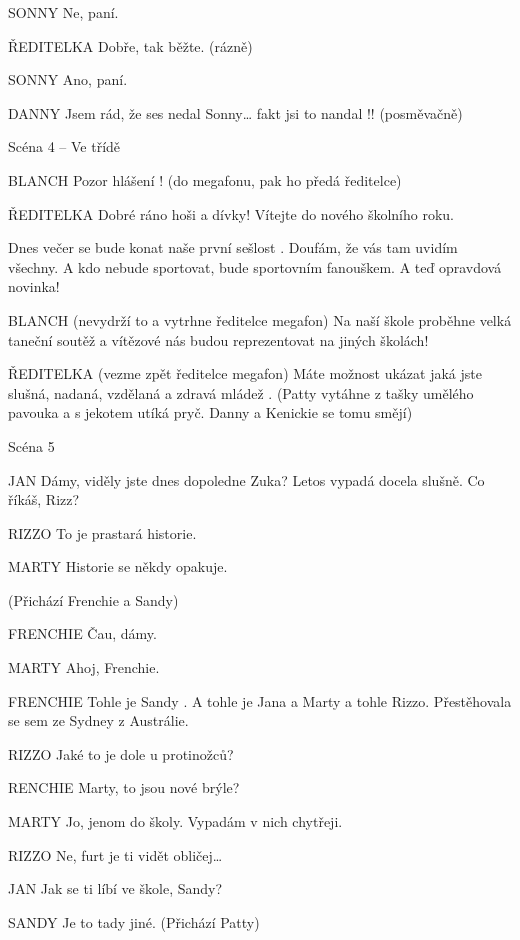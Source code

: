 SONNY        Ne, paní.

ŘEDITELKA        Dobře, tak běžte. (rázně)

SONNY        Ano, paní.

DANNY        Jsem rád, že ses nedal  Sonny… fakt jsi to nandal !! (posměvačně)

Scéna 4 – Ve třídě 

      BLANCH            Pozor hlášení ! (do megafonu, pak ho předá ředitelce)

        ŘEDITELKA                  Dobré ráno hoši a dívky! Vítejte do nového školního roku.

      Dnes večer se bude konat naše první sešlost . Doufám, že vás tam  uvidím všechny. A kdo nebude sportovat, bude sportovním fanouškem. A  teď opravdová novinka!  

      BLANCH            (nevydrží to a vytrhne ředitelce megafon) Na naší škole proběhne velká taneční soutěž  a vítězové nás budou reprezentovat na jiných školách!

      ŘEDITELKA        (vezme zpět ředitelce megafon) Máte možnost ukázat jaká jste slušná, nadaná, vzdělaná a zdravá mládež . (Patty vytáhne z tašky umělého pavouka a s jekotem utíká pryč.         Danny a Kenickie se tomu smějí)        

                                

Scéna 5 

JAN        Dámy, viděly jste dnes dopoledne Zuka? Letos vypadá docela slušně.         Co říkáš, Rizz?

RIZZO        To je prastará historie.

MARTY        Historie se někdy opakuje.

        (Přichází Frenchie a Sandy)

FRENCHIE        Čau, dámy.

MARTY        Ahoj, Frenchie.

FRENCHIE        Tohle je Sandy . A tohle je Jana a Marty a tohle Rizzo. Přestěhovala se         sem ze Sydney z Austrálie.

RIZZO        Jaké to je dole u protinožců?

RENCHIE        Marty, to jsou nové brýle?

MARTY        Jo, jenom do školy. Vypadám v nich chytřeji.

RIZZO        Ne, furt je ti vidět obličej…

JAN        Jak se ti líbí ve škole, Sandy?

SANDY        Je to tady jiné. (Přichází Patty)

